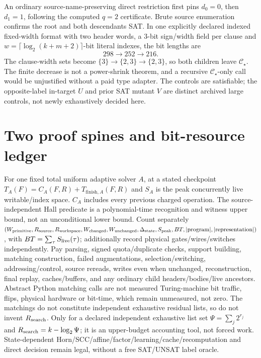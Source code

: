 \documentclass[11pt]{article}
\newcommand{\CS}{\mathcal C_\star}
\begin{document}
An ordinary source-name-preserving direct restriction first pins $d_0=0$, then $d_1=1$, following the computed $q=2$ certificate. Brute source enumeration confirms the root and both descendants SAT. In one explicitly declared indexed fixed-width format with two header words, a 3-bit sign/width field per clause and $w=\lceil\log_2(k+m+2)\rceil$-bit literal indexes, the bit lengths are
\[
\boxed{298\longrightarrow252\longrightarrow216}.
\]
The clause-width sets become $\{3\}\to\{2,3\}\to\{2,3\}$, so both children leave $\CS$. The finite decrease is not a power-shrink theorem, and a recursive $\CS$-only call would be unjustified without a paid type adapter. The controls are satisfiable; the opposite-label in-target $U$ and prior SAT mutant $V$ are distinct archived large controls, not newly exhaustively decided here.

\section{Two proof spines and bit-resource ledger}
For one fixed total uniform adaptive solver $A$, at a stated checkpoint
$T_A(F)=C_A(F,R)+T_{\mathrm{finish},A}(F,R)$ and $S_A$ is the peak concurrently live writable/index space. $C_A$ includes every previous charged operation. The source-independent Hall predicate is a polynomial-time recognition and witness upper bound, not an unconditional lower bound. Count separately $(W_{\rm primitive},R_{\rm source},R_{\rm workspace},W_{\rm changed},W_{\rm unchanged},\Delta_{\rm state},S_{\rm peak},BT,|\mathrm{program}|,|\mathrm{representation}|)$, with $BT=\sum_\tau S_{\rm live}(\tau)$; additionally record physical gates/wires/switches independently. Pay parsing, signed quota/duplicate checks, support building, matching construction, failed augmentations, selection/switching, addressing/control, source rereads, writes even when unchanged, reconstruction, final replay, caches/buffers, and any ordinary child headers/bodies/live ancestors. Abstract Python matching calls are not measured Turing-machine bit traffic, flips, physical hardware or bit-time, which remain unmeasured, not zero. The matchings do not constitute independent exhaustive residual lists, so do not invent $R_{\rm search}$. Only for a declared independent exhaustive list set $\Psi=\sum_j2^{r_j}$ and $R_{\rm search}=k-\log_2\Psi$; it is an upper-budget accounting tool, not forced work. State-dependent Horn/SCC/affine/factor/learning/cache/recomputation and direct decision remain legal, without a free SAT/UNSAT label oracle.
\end{document}
